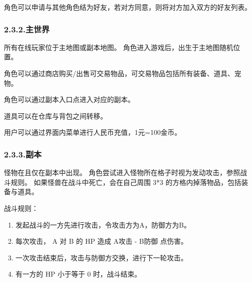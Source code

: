 \documentclass{article}
\begin{document}
角色可以申请与其他角色结为好友，若对方同意，则将对方加入双方的好友列表。%

\subsubsection{2.3.2.\hspace*{0.5em}主世界}\label{232}%

\noindent{}所有在线玩家位于主地图或副本地图。 角色进入游戏后，出生于主地图随机位置。%

角色可以通过商店购买/出售可交易物品，可交易物品包括所有装备、道具、宠物。%

角色可以通过副本入口点进入对应的副本。%

道具可以在仓库与背包之间转移。%

用户可以通过界面内菜单进行人民币充值，1元=100金币。%

\subsubsection{2.3.3.\hspace*{0.5em}副本}\label{233}%

\noindent{}怪物在且仅在副本中出现。 角色尝试进入怪物所在格子时视为发动攻击，参照战斗规则。 如果怪兽在战斗中死亡，会在自己周围 3*3 的方格内掉落物品，包括装备与道具。%

战斗规则：%

\begin{enumerate}[noitemsep,topsep=\mdcompacttopsep]%

\item{}发起战斗的一方先进行攻击，令攻击方为A，防御方为B。%

\item{}每次攻击， A 对 B 的 HP 造成 A攻击 - B防御 点伤害。%

\item{}一次攻击结束后，攻击与防御方交换，进行下一轮攻击。%

\item{}有一方的 HP 小于等于 0 时，战斗结束。%
\end{enumerate}%
\end{document}
